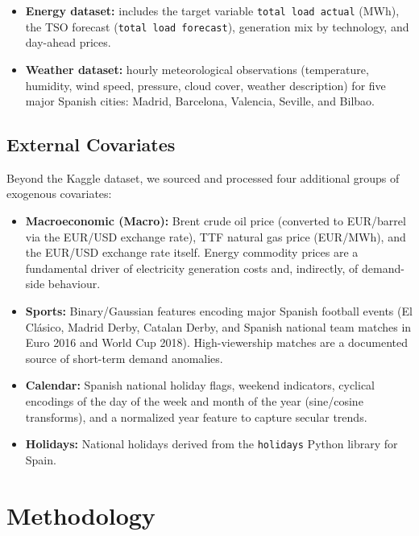 \documentclass[11pt,a4paper]{article}
\begin{document}
\begin{itemize}[nosep]
    \item \textbf{Energy dataset:} includes the target variable \texttt{total load actual} (MWh), the TSO forecast (\texttt{total load forecast}), generation mix by technology, and day-ahead prices.
    \item \textbf{Weather dataset:} hourly meteorological observations (temperature, humidity, wind speed, pressure, cloud cover, weather description) for five major Spanish cities: Madrid, Barcelona, Valencia, Seville, and Bilbao.
\end{itemize}

\subsection{External Covariates}

Beyond the Kaggle dataset, we sourced and processed four additional groups of exogenous covariates:

\begin{itemize}[nosep]
    \item \textbf{Macroeconomic (Macro):} Brent crude oil price (converted to EUR/barrel via the EUR/USD exchange rate), TTF natural gas price (EUR/MWh), and the EUR/USD exchange rate itself. Energy commodity prices are a fundamental driver of electricity generation costs and, indirectly, of demand-side behaviour.
    \item \textbf{Sports:} Binary/Gaussian features encoding major Spanish football events (El Cl\'asico, Madrid Derby, Catalan Derby, and Spanish national team matches in Euro 2016 and World Cup 2018). High-viewership matches are a documented source of short-term demand anomalies.
    \item \textbf{Calendar:} Spanish national holiday flags, weekend indicators, cyclical encodings of the day of the week and month of the year (sine/cosine transforms), and a normalized year feature to capture secular trends.
    \item \textbf{Holidays:} National holidays derived from the \texttt{holidays} Python library for Spain.
\end{itemize}

\section{Methodology}
\end{document}
